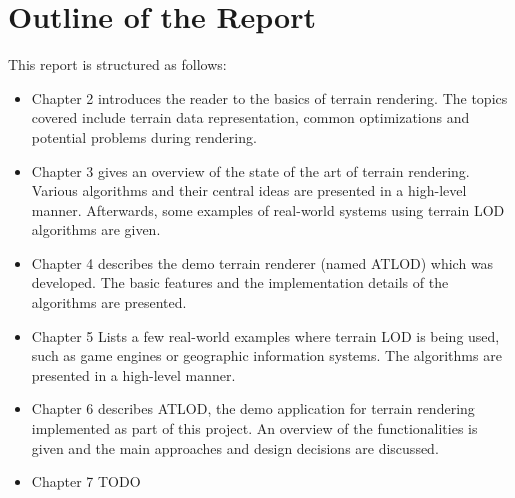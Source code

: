 \section{Outline of the Report}
This report is structured as follows:
\begin{itemize}
  \item Chapter 2 introduces the reader to the basics of terrain rendering. The topics covered include 
        terrain data representation, common optimizations and potential problems during rendering.
  \item Chapter 3 gives an overview of the state of the art of terrain rendering.
        Various algorithms and their central ideas are presented in a high-level manner.
        Afterwards, some examples of real-world systems using terrain LOD algorithms are given.
  \item Chapter 4 describes the demo terrain renderer (named ATLOD) which was developed.
        The basic features and the implementation details of the algorithms are presented.
  \item Chapter 5 Lists a few real-world examples where terrain LOD is being used, such as 
        game engines or geographic information systems.
        The algorithms are presented in a high-level manner.
  \item Chapter 6 describes ATLOD, the demo application for terrain rendering implemented as part of this project.
        An overview of the functionalities is given and the main approaches and design decisions are discussed.
  \item Chapter 7 TODO
\end{itemize}


